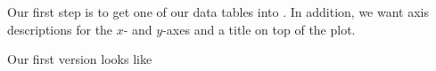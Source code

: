 Our first step is to get one of our data tables into \PGFPlots{}. In addition,
we want axis descriptions for the $x$- and $y$-axes and a title on top of the
plot.

Our first version looks like
%
\begin{codeexample}[]

%


%
\end{codeexample}

